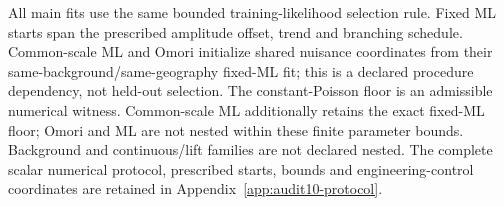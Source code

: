 All main fits use the same bounded training-likelihood selection rule. Fixed ML starts span the prescribed amplitude offset, trend and branching schedule. Common-scale ML and Omori initialize shared nuisance coordinates from their same-background/same-geography fixed-ML fit; this is a declared procedure dependency, not held-out selection. The constant-Poisson floor is an admissible numerical witness. Common-scale ML additionally retains the exact fixed-ML floor; Omori and ML are not nested within these finite parameter bounds. Background and continuous/lift families are not declared nested.
The complete scalar numerical protocol, prescribed starts, bounds and engineering-control coordinates are retained in Appendix~\ref{app:audit10-protocol}.

